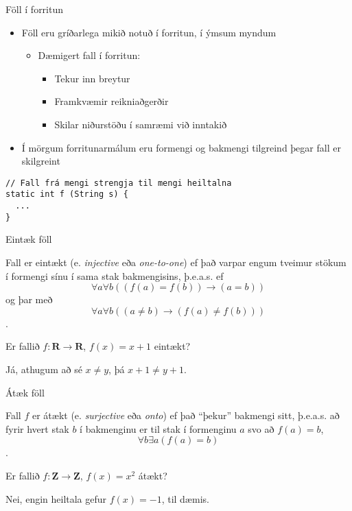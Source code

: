 \documentclass[handout]{beamer}
\begin{document}
\begin{frame}[fragile]{Föll í forritun}
\begin{itemize}
 \item Föll eru gríðarlega mikið notuð í forritun, í ýmsum myndum
 \begin{itemize}
  \item Dæmigert fall í forritun:
  \begin{itemize}
   \item Tekur inn breytur
   \item Framkvæmir reikniaðgerðir
   \item Skilar niðurstöðu í samræmi við inntakið 
  \end{itemize}
 \end{itemize}
 \item Í mörgum forritunarmálum eru formengi og bakmengi tilgreind þegar fall er skilgreint
\end{itemize}
\begin{verbatim}
// Fall frá mengi strengja til mengi heiltalna
static int f (String s) {
  ...
}
\end{verbatim}

\end{frame}

\begin{frame}{Eintæk föll}
\begin{tcolorbox}[title=Eintækt fall]
Fall er eintækt (e. \emph{injective} eða \emph{one-to-one}) ef það varpar engum tveimur stökum í formengi sínu í sama stak bakmengisins, þ.e.a.s. ef \[\forall a \forall b ((f(a) = f(b)) \to (a = b))\] og þar með \[\forall a \forall b ((a \neq b) \to (f(a) \neq f(b)))\].
\end{tcolorbox}

Er fallið $f: \mathbf{R} \to \mathbf{R}$, $f(x) = x + 1$ eintækt? \pause

Já, athugum að sé $x \neq y$, þá $x + 1 \neq y + 1$.
\end{frame}

\begin{frame}{Átæk föll}
\begin{tcolorbox}[title=Átækt fall]
Fall $f$ er átækt (e. \emph{surjective} eða \emph{onto}) ef það ``þekur'' bakmengi sitt, þ.e.a.s. að fyrir hvert stak $b$ í bakmenginu er til stak í formenginu $a$ svo að $f(a) = b$, \[\forall b \exists a (f(a) = b)\].
\end{tcolorbox}
Er fallið $f: \mathbf{Z} \to \mathbf{Z}$, $f(x) = x^2$ átækt? \pause

Nei, engin heiltala gefur $f(x) = -1$, til dæmis.
\end{frame}
\end{document}
